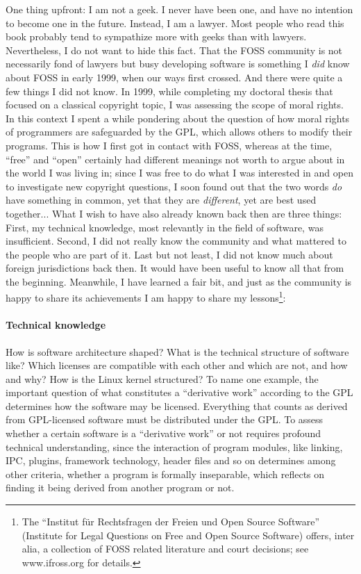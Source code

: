 One thing upfront: I am not a geek. I never have been one, and have no intention to become one in the future. 
Instead, I am a lawyer. Most people who read this book probably tend to sympathize more with geeks than with lawyers. Nevertheless, I do not want to hide this fact. That the FOSS community is not necessarily fond of lawyers but busy developing software is something I \textit{did} know about FOSS in early 1999, when our ways first crossed. And there were quite a few things I did not know.
In 1999, while completing my doctoral thesis that focused on a classical copyright topic, I was assessing the scope of moral rights. In this context I spent a while pondering about the question of how moral rights of programmers are safeguarded by the GPL, which allows others to modify their programs. This is how I first got in contact with FOSS, whereas at the time, “free” and “open” certainly had different meanings not worth to argue about in the world I was living in; since I was free to do what I was interested in and open to investigate new copyright questions, I soon found out that the two words \textit{do} have something in common, yet that they are \textit{different}, yet are best used together...
What I wish to have also already known back then are three things:
First, my technical knowledge, most relevantly in the field of software, was insufficient. Second, I did not really know the community and what mattered to the people who are part of it. Last but not least, I did not know much about foreign jurisdictions back then. It would have been useful to know all that from the beginning. Meanwhile, I have learned a fair bit, and just as the community is happy to share its achievements I am happy to share my lessons\footnote{The “Institut f\"ur Rechtsfragen der Freien und Open Source Software” (Institute for Legal Questions on Free and Open Source Software) offers, inter alia, a collection of FOSS related literature and court decisions; see www.ifross.org for details.}:

\paragraph*{Technical knowledge}
How is software architecture shaped? What is the technical structure of software like? Which licenses are compatible with each other and which are not, and how and why? How is the Linux kernel structured? 
To name one example, the important question of what constitutes a “derivative work” according to the GPL determines how the software may be licensed. Everything that counts as derived from GPL-licensed software must be distributed under the GPL. To assess whether a certain software is a “derivative work” or not requires profound technical understanding, since the interaction of program modules, like linking, IPC, plugins, framework technology, header files and so on determines among other criteria, whether a program is formally inseparable, which reflects on finding it being derived from another program or not. 

